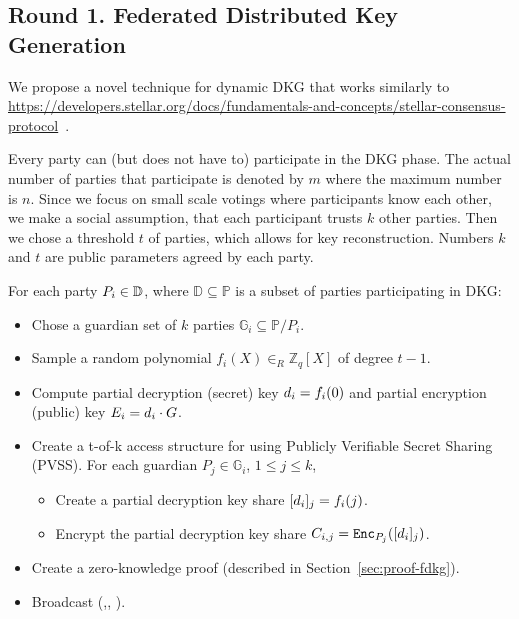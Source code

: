\documentclass{article}
\begin{document}
\subsection{Round 1. Federated Distributed Key Generation}

We propose a novel technique for dynamic DKG that works similarly to \href{Stellar Consensus Protocol}{https://developers.stellar.org/docs/fundamentals-and-concepts/stellar-consensus-protocol}~\cite{mazieresStellarConsensusProtocol2015}.

Every party can (but does not have to) participate in the DKG phase. The actual number of parties that participate is denoted by $m$ where the maximum number is $n$. Since we focus on small scale votings where participants know each other, we make a social assumption, that each participant trusts $k$ other parties. Then we chose a threshold $t$ of parties, which allows for key reconstruction. Numbers $k$ and $t$ are public parameters agreed by each party.


For each party $P_{i} \in \mathbb{D}$, where $\mathbb{D} \subseteq  \mathbb{P}$ is a subset of parties participating in DKG:
\begin{itemize}
    \item Chose a guardian set of $k$ parties  $\mathbb{G}_i\subseteq \mathbb{P}/P_i$.
    \item Sample a random polynomial $f_{i}(X) \in_R \mathbb{Z}_q[X]$ of degree $t-1$.
    \item Compute partial decryption (secret) key $d_{i}= f_i(0)$ and partial encryption (public) key $E_{i} = d_{i} \cdot G$.
    \item Create a t-of-k access structure for  using Publicly Verifiable Secret Sharing (PVSS). For each guardian $P_{j} \in \mathbb{G}_i$, $1 \leq j \leq k$, \begin{itemize}
    \item Create a partial decryption key share $[d_{i}]_{j}=f_i(j)$.
    \item Encrypt the partial decryption key share $C_{i,j}=\texttt{Enc}_{P_{j}}([d_{i}]_{j})$.
    \end{itemize}
    
    \item Create a zero-knowledge proof (described in Section~\ref{sec:proof-fdkg}).
    \item Broadcast (,, ).
\end{itemize}
\end{document}

